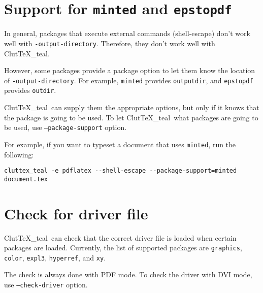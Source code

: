 \documentclass[a4paper]{report}
\newcommand\ClutTeX{Clut\TeX\_teal}
\newcommand\texpkg[1]{\texttt{#1}}
\begin{document}
\section{Support for \texpkg{minted} and \texpkg{epstopdf}}
In general, packages that execute external commands (shell-escape) don't work well with \texttt{-output-directory}.
Therefore, they don't work well with \ClutTeX.

However, some packages provide a package option to let them know the location of \texttt{-output-directory}.
For example, \texpkg{minted} provides \texttt{outputdir}, and \texpkg{epstopdf} provides \texttt{outdir}.

\ClutTeX\ can supply them the appropriate options, but only if it knows that the package is going to be used.
To let \ClutTeX\ what packages are going to be used, use \texttt{--package-support} option.

For example, if you want to typeset a document that uses \texpkg{minted}, run the following:
\begin{verbatim}
cluttex_teal -e pdflatex --shell-escape --package-support=minted document.tex
\end{verbatim}

\section{Check for driver file}

\ClutTeX\ can check that the correct driver file is loaded when certain packages are loaded.
Currently, the list of supported packages are \texpkg{graphics}, \texpkg{color}, \texpkg{expl3}, \texpkg{hyperref}, and \texpkg{xy}.

The check is always done with PDF mode.
To check the driver with DVI mode, use \texttt{--check-driver} option.
\end{document}

